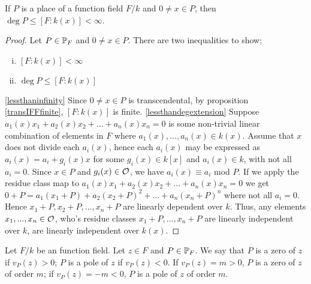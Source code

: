 \begin{proposition} 
	If $P$ is a place of a function field $F/k$ and 
	$0 \neq x \in P$, then $ \deg P \leq [F:k(x)] < \infty $.
\end{proposition}

\begin{proof}
	Let $P \in \mathbb{P}_F $ and $0\neq  x \in P$. There are two inequalities 
	to show; 
	\begin{enumerate}[(i)]
		\item \label{lessthaninfinity} $[F:k(x)] < \infty $ 
		\item \label{lessthandegextension} $ \deg P \leq [F:k(x)]$
	\end{enumerate}
	\eqref{lessthaninfinity} Since $0 \neq x \in P$ is 
	transcendental, by proposition \ref{transIFFfinite}, $[F:k(x)]$ is finite.
	\eqref{lessthandegextension} Suppose $a_1(x)x_1 + a_2(x)x_2 + ... + a_n(x)x_n = 0$ 
	is some non-trivial linear combination of elements in $F$ where
	$a_1(x),...,a_n(x) \in k(x)$. Assume that $x$ does not divide each
	$a_i(x)$, hence each $a_i(x)$ may be expressed as $a_i(x) = a_i + g_i(x)x$ 
	for some $g_i(x) \in k[x]$ and $a_i(x) \in k$, with not all $a_i = 0$. 
	Since $x \in P$ and $g_i(x ) \in \mathcal{O}$, we have $a_i(x) \equiv a_i$ 
	mod $P$. If we apply the residue class map to $a_1(x)x_1 + a_2(x)x_2 + ... + a_n(x)x_n = 0$ 
	we get $0 + P = a_1(x_1 + P) + a_2(x_2 + P)^2 + ... + a_n(x_n + P)^n $ 
	where not all $a_i = 0$. Hence $x_1 + P,x_2 + P, ..., x_n + P $ are 
	linearly dependent over $k$. Thus, any elements $x_1,...,x_n \in \mathcal{O}$, 
	who's residue classes $x_1 + P,...,x_n + P$ are linearly independent 
	over $k$, are linearly independent over $k(x)$.
\end{proof}

\begin{definition}
	Let $F/k $ be an function field. 
	Let $z \in F $ and $P \in \mathbb{P}_F$. We say that $P$ is 
	a zero of $z$ if $v_P(z) > 0$; $P $ is a pole of $z $ 
	if $v_P(z) < 0$. If $v_P(z) = m > 0$, $P$ is a zero of $z$ 
	of order $m$; if $v_P(z) = -m < 0 $, $P$ is a pole of $z$ 
	of order $m$.
\end{definition}

